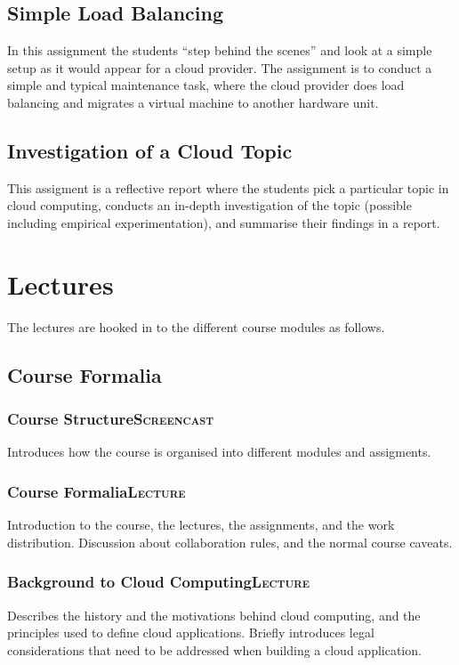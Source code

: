 \documentclass[11pt]{article}
\begin{document}
\subsection{Simple Load Balancing}
\label{sec-2-3}
In this assignment the students ``step behind the scenes'' and look at a simple setup as it would appear for a cloud provider. The assignment is to conduct a simple and typical maintenance task, where the cloud provider does load balancing and migrates a virtual machine to another hardware unit.
\subsection{Investigation of a Cloud Topic}
\label{sec-2-4}
This assigment is a reflective report where the students pick a particular topic in cloud computing, conducts an in-depth investigation of the topic (possible including empirical experimentation), and summarise their findings in a report.
\section{Lectures}
\label{sec-3}
The lectures are hooked in to the different course modules as follows.
\subsection{Course Formalia}
\label{sec-3-1}
\subsubsection[Course Structure]{Course Structure\hfill{}\textsc{Screencast}}
\label{sec-3-1-1}
Introduces how the course is organised into different modules and assigments.
\subsubsection[Course Formalia]{Course Formalia\hfill{}\textsc{Lecture}}
\label{sec-3-1-2}
Introduction to the course, the lectures, the assignments, and the work distribution.
Discussion about collaboration rules, and the normal course caveats.
\subsubsection[Background to Cloud Computing]{Background to Cloud Computing\hfill{}\textsc{Lecture}}
\label{sec-3-1-3}
Describes the history and the motivations behind cloud computing, and the principles used to define cloud applications. Briefly introduces legal considerations that need to be addressed when building a cloud application.
\end{document}
